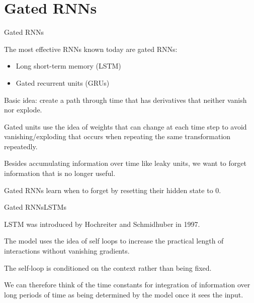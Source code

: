 \documentclass{beamer}
\begin{document}
\section{Gated RNNs}

\begin{frame}{Gated RNNs}

  The most effective RNNs known today are \alert{gated RNNs}:
  \begin{itemize}
  \item Long short-term memory (LSTM)
  \item Gated recurrent units (GRUs)
  \end{itemize}

  \medskip

  Basic idea: create a path through time that has derivatives that neither
  vanish nor explode.

  \medskip

  Gated units use the idea of weights that can \alert{change at each
    time step} to avoid vanishing/exploding that occurs when repeating
  the same transformation repeatedly.

  \medskip

  Besides \alert{accumulating} information over time like leaky units,
  we want to \alert{forget} information that is no longer useful.

  \medskip

  Gated RNNs \alert{learn when to forget} by resetting their hidden
  state to 0.
  
\end{frame}


\begin{frame}{Gated RNNs}{LSTMs}

  LSTM was introduced by Hochreiter and Schmidhuber in 1997.

  \medskip

  The model uses the idea of \alert{self loops} to increase the
  practical length of interactions without vanishing gradients.

  \medskip

  The self-loop is \alert{conditioned on the context} rather than
  being fixed.

  \medskip

  We can therefore think of the time constants for integration of
  information over long periods of time as being \alert{determined by
    the model once it sees the input}.
  
\end{frame}
\end{document}
